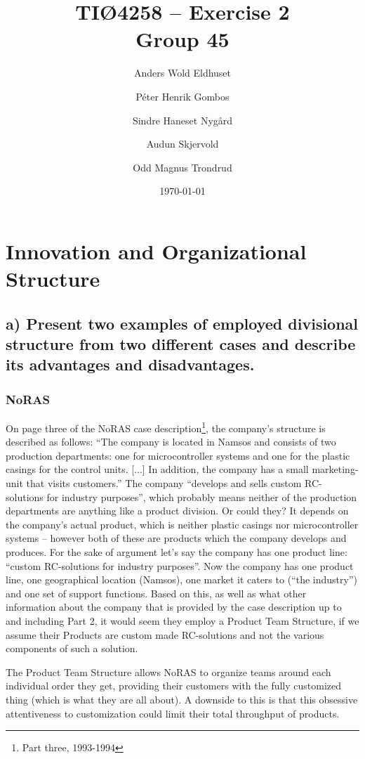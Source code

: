 \documentclass[a4paper]{article}
\title{TIØ4258 -- Exercise 2 \\ Group 45}
\author{
    Anders Wold Eldhuset \and
    Péter Henrik Gombos \and
    Sindre Haneset Nygård \and
    Audun Skjervold \and
    Odd Magnus Trondrud
}
\date{\today}
\begin{document}
    \maketitle
    \newpage
    \setcounter{secnumdepth}{2}

    \section{Innovation and Organizational Structure} %

    \subsection*{a) Present two examples of employed divisional structure from
    two different cases and describe its advantages and disadvantages.}

    \subsubsection{NoRAS} On page three of the NoRAS case
    description\footnote{Part three, 1993-1994}, the company's structure is
    described as follows: ``The company is located in Namsos and consists
    of two production departments: one for microcontroller systems and one
    for the plastic casings for the control units. [...] In addition, the
    company has a small marketing-unit that visits customers.'' The company
    ``develops and sells custom RC-solutions for industry purposes'', which
    probably means neither of the production departments are anything like
    a product division. Or could they? It depends on the company's actual
    product, which is neither plastic casings nor microcontroller systems
    -- however both of these are products which the company develops and
    produces. For the sake of argument let's say the company has one product
    line: ``custom RC-solutions for industry purposes''. Now the company has
    one product line, one geographical location (Namsos), one market it caters
    to (``the industry'') and one set of support functions. Based on this, as
    well as what other information about the company that is provided by the
    case description up to and including Part 2, it would seem they employ
    a Product Team Structure, if we assume their Products are custom made
    RC-solutions and not the various components of such a solution.

    The Product Team Structure allows NoRAS to organize teams around each
    individual order they get, providing their customers with the fully
    customized thing (which is what they are all about).
    A downside to this is that this obsessive attentiveness to customization
    could limit their total throughput of products.
\end{document}

